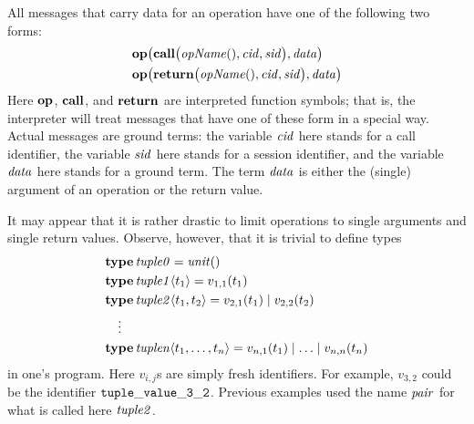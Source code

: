 \documentclass[a4paper,12pt,oneside,fleqn]{book} %
\begin{document}
{All messages that carry data for an operation have one of the following two
forms:
\begin{align}
  &{\bf op}\bigl(
    {\bf call}\bigl({\it opName}(), {\it cid}, {\it sid}\bigr),
    {\it data}
  \bigr)
\\
  &{\bf op}\bigl(
    {\bf return}\bigl({\it opName}(), {\it cid}, {\it sid}\bigr),
    {\it data}
  \bigr)
\end{align}
Here ${\bf op}$, $\bf call$, and $\bf return$ are interpreted function
symbols; that is, the interpreter will treat messages that have one of
these form in a special way. Actual messages are ground terms: the variable
$\it cid$ here stands for a call identifier, the variable $\it sid$ here
stands for a session identifier, and the variable $\it data$ here stands
for a ground term. The term $\it data$ is either the (single) argument of
an operation or the return value.

\begin{remark}
It may appear that it is rather drastic to limit operations to single
arguments and single return values. Observe, however, that it is trivial to
define types
\begin{align}
&{\bf type}\,{\it tuple0} = {\it unit}() \\
&{\bf type}\,{\it tuple1}\langle t_1\rangle = v_{1,1}(t_1) \\
&{\bf type}\,{\it tuple2}\langle t_1,t_2\rangle = v_{2,1}(t_1) \mid v_{2,2}(t_2) \\
&\quad\vdots\notag \\
&{\bf type}\,{\it tuplen}\langle t_1,\ldots,t_n\rangle
  = v_{n,1}(t_1) \mid \ldots \mid v_{n,n}(t_n)
\end{align}
in one's program. Here $v_{i,j}$s are simply fresh identifiers. For
example, $v_{3,2}$ could be the identifier ${\tt tuple\_value\_3\_2}$.
Previous examples used the name $\it pair$ for what is called here $\it
tuple2$.
\end{remark}

}
\end{document}
